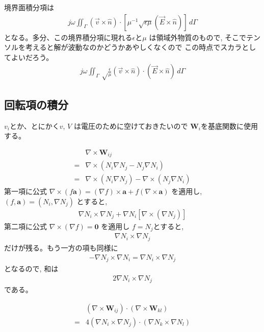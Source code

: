境界面積分項は
\begin{align}
j\omega\iint_\Gamma
\left(\vec{v}\times\hat{n}\right)\cdot
\left[\mu^{-1}
\sqrt{\epsilon\mu}\left(\vec{E}\times\hat{n}\right)
\right]\,d\Gamma
\end{align}
となる。多分、この境界積分項に現れる$\epsilon$と$\mu$
は領域外物質のもので,
そこでテンソルを考えると解が波動なのかどうかあやしくなくので%
この時点でスカラとしてよいだろう。
\begin{align}
j\omega\iint_\Gamma\sqrt\frac{\epsilon}{\mu}
\left(\vec{v}\times\hat{n}\right)\cdot
\left(\vec{E}\times\hat{n}\right)
\,d\Gamma
\end{align}

\subsection{回転項の積分}

$v_i$とか、とにかく$v$, $V$
は電圧のために空けておきたいので
$\bm{W}_i$を基底関数に使用する。

\begin{align}
&\nabla\times\bm{W}_{ij}\\
=&\nabla\times\left(N_i\nabla N_j-N_j\nabla N_i\right)\\
=&\nabla\times\left(N_i\nabla N_j\right)
 -\nabla\times\left(N_j\nabla N_i\right)
\end{align}
第一項に公式
$\nabla\times\left(f\bm{a}\right)
=\left(\nabla f\right)\times\bm{a}
+f\left(\nabla\times\bm{a}\right)$
を適用し,
$\left(f, \bm{a}\right)
=\left(N_i, \nabla N_j\right)$
とすると,
\begin{align}
\nabla N_i\times\nabla N_j
+\nabla N_i\left[\nabla\times\left(\nabla N_j\right)\right]
\end{align}
第二項に公式
$\nabla\times\left(\nabla f\right)=\bm{0}$
を適用し
$f=N_j$とすると,
\begin{align}
\nabla N_i\times\nabla N_j
\end{align}
だけが残る。もう一方の項も同様に
\begin{align}
-\nabla N_j\times\nabla N_i = \nabla N_i\times\nabla N_j
\end{align}
となるので, 和は
\begin{align}
2\nabla N_i\times\nabla N_j
\end{align}
である。

\begin{align}
&\left(\nabla\times\bm{W}_{ij}\right)\cdot
\left(\nabla\times\bm{W}_{kl}\right)\\
=&4\left(\nabla N_i\times\nabla N_j\right)\cdot
   \left(\nabla N_k\times\nabla N_l\right)
\end{align}


